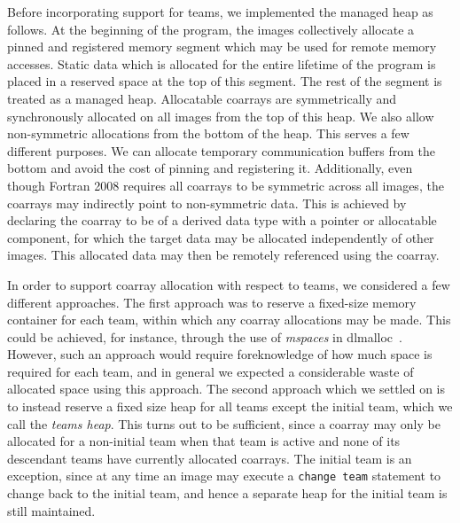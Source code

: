 
Before incorporating support for teams, we implemented the managed heap as
follows. At the beginning of the program, the images collectively allocate a
pinned and registered memory segment which may be used for remote memory
accesses.  Static data which is allocated for the entire lifetime of the
program is placed in a reserved space at the top of this segment. The rest of
the segment is treated as a managed heap. Allocatable coarrays are
symmetrically and synchronously allocated on all images from the top of this
heap. We also allow non-symmetric allocations from the bottom of the heap.
This serves a few different purposes. We can allocate temporary communication
buffers from the bottom and avoid the cost of pinning and registering it.
Additionally, even though Fortran 2008 requires all coarrays to be symmetric
across all images, the coarrays may indirectly point to non-symmetric data.  This is
achieved by declaring the coarray to be of a derived data type with a pointer
or allocatable component, for which the target data may be allocated
independently of other images. This allocated data may then be remotely
referenced using the coarray.

In order to support coarray allocation with respect to teams, we considered a
few different approaches. The first approach was to reserve a
fixed-size memory container for each team, within which any coarray
allocations may be made. This could be achieved, for instance, through the use
of \textit{mspaces} in dlmalloc~\cite{dlmalloc}. However, such an approach
would require foreknowledge of how much space is required for each team, and in
general we expected a considerable waste of allocated space using this
approach.
The second approach which we settled on is to instead reserve a fixed size
heap for all teams except the initial team, which we call the \textit{teams
heap}. This turns out to be sufficient, since a coarray may only be allocated
for a non-initial team when that team is active and none of its descendant
teams have currently allocated coarrays. The initial team is an exception,
since at any time an image may execute a \texttt{change team} statement to
change back to the initial team, and hence a separate heap for the initial team is
still maintained.

